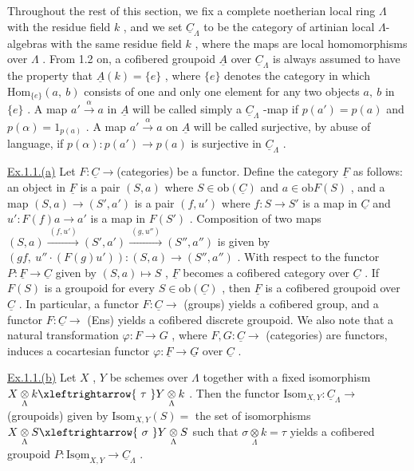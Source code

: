 Throughout the rest of this section, we fix a complete noetherian local ring  $\Lambda$  with the residue field  $k$  , and we set  $\underline{C}_{\Lambda}$  to be the category of artinian local  $\Lambda$-algebras with the same residue field  $k$  , where the maps are local homomorphisms over  $\Lambda$  . From 1.2 on, a cofibered groupoid  $\underline{A}$  over  $\underline{C}_{\Lambda}$ is always assumed to have the property that  $\underline{A}(k) = \{e\}$  , where  $\{e\}$  denotes the category in which  $\mathrm{Hom}_{\{e\}}(a,\ b)$  consists of one and only one element for any  two objects  $a,\ b$  in  $\{e\}$  . A map  $a' \xrightarrow{\ \alpha\ } a$  in  $\underline{A}$  will be called simply a $\underline{C}_{\Lambda}$ -map if  $p(a') = p(a)$  and  $p(\alpha) = 1_{p(a)}$  . A map  $a' \xrightarrow{\ \alpha\ } a$  on  $\underline{A}$  will be called surjective, by abuse of language, if  $p(\alpha) : p(a') \longrightarrow p(a)$  is surjective in  $\underline{C}_{\Lambda}$  .

\underline{Ex.1.1.(a)}  Let  $F : \underline{C} \longrightarrow$(categories) be a functor. Define the category $\underline{F}$  as follows:  an object in  $\underline{F}$  is a pair  $(S,a)$  where  $S \in \mathrm{ob}(\underline{C})$  and $a \in \mathrm{ob}F(S)$  , and a map  $(S,a) \to (S',a')$  is a pair  $(f,u')$  where  $f : S \to S'$  is a map in  $\underline{C}$  and  $u' : F(f)a \to a'$  is a map in  $F(S')$  . Composition of two maps $(S,a) \xrightarrow{\ (f,u')\ } (S',a') \xrightarrow{\ (g,u'')\ } (S'',a'')$  is given by $(gf,\ u''\cdot(F(g)u')) : (S,a) \to (S'',a'')$  . With respect to the functor  $P : \underline{F} \to \underline{C}$ given by  $(S,a) \mapsto S$  ,  $\underline{F}$  becomes a cofibered category over  $\underline{C}$  . If  $F(S)$  is a groupoid for every  $S \in \mathrm{ob}(\underline{C})$  , then  $\underline{F}$  is a cofibered groupoid over  $\underline{C}$  . In particular, a functor  $F : \underline{C} \to$ (groups) yields a cofibered group, and a functor $F : \underline{C} \to$ (Ens)  yields a cofibered discrete groupoid. We also note that a natural transformation  $\varphi : F \to G$  , where  $F,G : \underline{C} \to$ (categories) are functors, induces a cocartesian functor  $\varphi : \underline{F} \to \underline{G}$  over  $\underline{C}$  .

\underline{Ex.1.1.(b)}  Let  $X$  ,  $Y$  be schemes over  $\Lambda$  together with a fixed
isomorphism  $X \underset{\Lambda}{\otimes} k \xleftrightarrow{\ \tau\ } Y \underset{\Lambda}{\otimes} k$  . Then the functor  $\mathrm{Isom}_{X,Y} : \underline{C}_{\Lambda} \to$ (groupoids) given by  $\mathrm{Isom}_{X,Y}(S) =$ the set of isomorphisms  $X \underset{\Lambda}{\otimes} S \xleftrightarrow{\ \sigma\ } Y \underset{\Lambda}{\otimes} S$  such that $\sigma \underset{\Lambda}{\otimes} k = \tau$  yields a cofibered groupoid  $P : \underline{\mathrm{Isom}}_{X,Y} \to \underline{C}_{\Lambda}$  .

